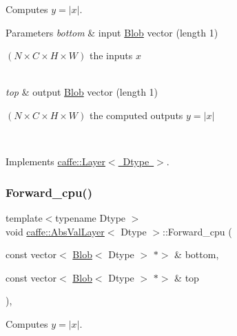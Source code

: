 Computes $ y = |x| $. 


\begin{DoxyParams}{Parameters}
{\em bottom} & input \mbox{\hyperlink{classcaffe_1_1_blob}{Blob}} vector (length 1)
\begin{DoxyEnumerate}
\item $ (N \times C \times H \times W) $ the inputs $ x $ 
\end{DoxyEnumerate}\\
\hline
{\em top} & output \mbox{\hyperlink{classcaffe_1_1_blob}{Blob}} vector (length 1)
\begin{DoxyEnumerate}
\item $ (N \times C \times H \times W) $ the computed outputs $ y = |x| $ 
\end{DoxyEnumerate}\\
\hline
\end{DoxyParams}


Implements \mbox{\hyperlink{classcaffe_1_1_layer_a576ac6a60b1e99fe383831f52a6cea77}{caffe\+::\+Layer$<$ Dtype $>$}}.

\mbox{\label{classcaffe_1_1_abs_val_layer_a094d7da8c6d6eeebc7db189f4cd258f9}} 
\subsubsection{\texorpdfstring{Forward\+\_\+cpu()}{Forward\_cpu()}\hspace{0.1cm}{\footnotesize\ttfamily [2/2]}}
{\footnotesize\ttfamily template$<$typename Dtype $>$ \\
void \mbox{\hyperlink{classcaffe_1_1_abs_val_layer}{caffe\+::\+Abs\+Val\+Layer}}$<$ Dtype $>$\+::Forward\+\_\+cpu (\begin{DoxyParamCaption}\item[{const vector$<$ \mbox{\hyperlink{classcaffe_1_1_blob}{Blob}}$<$ Dtype $>$ $\ast$$>$ \&}]{bottom,  }\item[{const vector$<$ \mbox{\hyperlink{classcaffe_1_1_blob}{Blob}}$<$ Dtype $>$ $\ast$$>$ \&}]{top }\end{DoxyParamCaption})\hspace{0.3cm}{\ttfamily [protected]}, {\ttfamily [virtual]}}



Computes $ y = |x| $. 


